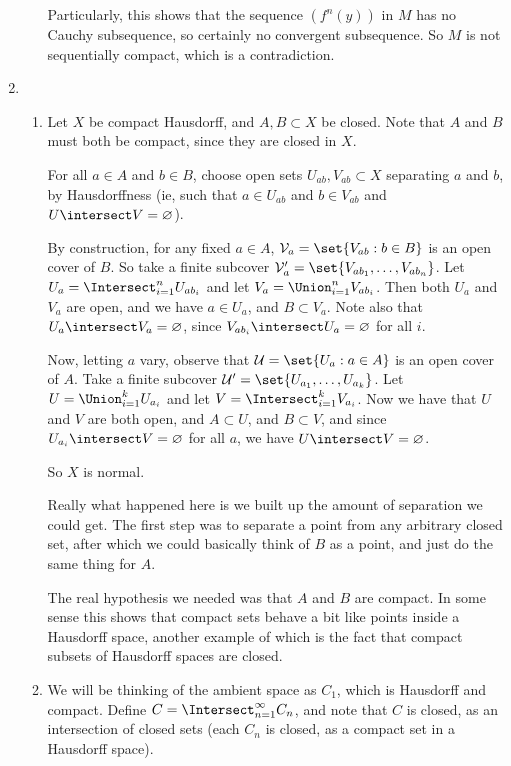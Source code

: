\documentclass[a4paper,12pt,fleqn]{article}
\begin{document}
\begin{enumerate}[label=\arabic*.,leftmargin=*]
\begin{enumerate}[label=(\alph*)]
    Particularly, this shows that the sequence \((f^n(y))\) in \(M\) has no
    Cauchy subsequence, so certainly no convergent subsequence. So \(M\) is not
    sequentially compact, which is a contradiction.
  \end{enumerate}
 \item
  \begin{enumerate}[label=(\alph*)]
   \item
    Let \(X\) be compact Hausdorff, and \(A, B \subset X\) be closed. Note that
    \(A\) and \(B\) must both be compact, since they are closed in \(X\).

    For all
    \(a \in A\) and \(b \in B\), choose open sets \(U_{ab}, V_{ab} \subset X\)
    separating \(a\) and \(b\), by Hausdorffness
    (ie, such that \(a \in U_{ab}\) and \(b \in V_{ab}\) and
    \(U \intersect V = \emptyset\)).

    By construction, for any fixed \(a \in A\),
    \(\mathcal V_a = \set{V_{ab} : b \in B}\) is an open cover of \(B\).
    So take a finite subcover
    \(\mathcal V_a' = \set{V_{ab_1}, \dotsc, V_{ab_n}}\).
    Let \(U_a = \Intersect_{i = 1}^n U_{ab_i}\) and let
    \(V_a = \Union_{i = 1}^n V_{ab_i}\). Then both \(U_a\) and
    \(V_a\) are open, and we have \(a \in U_a\), and
    \(B \subset V_a\). Note also that \(U_a \intersect V_a = \emptyset\), since
    \(V_{ab_i} \intersect U_a = \emptyset\) for all \(i\).

    Now, letting \(a\) vary, observe that \(\mathcal U = \set{U_a : a \in A}\)
    is an open cover of \(A\). Take a finite subcover
    \(\mathcal U' = \set{U_{a_1}, \dotsc, U_{a_k}}\).
    Let \(U = \Union_{i = 1}^k U_{a_i}\) and let
    \(V = \Intersect_{i = 1}^k V_{a_i}\).
    Now we have that \(U\) and \(V\) are both open, and \(A \subset U\),
    and \(B \subset V\), and since \(U_{a_i} \intersect V = \emptyset\) for all
    \(a\), we have \(U \intersect V = \emptyset\).

    So \(X\) is normal.
    \begin{remark}
     Really what happened here is we built up the amount of separation we could
     get. The first step was to separate a point from any arbitrary closed set,
     after which we could basically think of \(B\) as a point, and just do the
     same thing for \(A\).

     The real hypothesis we needed was that \(A\) and \(B\) are compact. In some
     sense this shows that compact sets behave a bit like points inside a
     Hausdorff space, another example of which is the fact that compact subsets
     of Hausdorff spaces are closed.
    \end{remark}
   \item
    We will be thinking of the ambient space as \(C_1\), which is Hausdorff and
    compact. Define \(C = \Intersect_{n = 1}^\infty C_n\), and note that \(C\)
    is closed, as an intersection of closed sets (each \(C_n\) is closed, as a
    compact set in a Hausdorff space).


\end{enumerate}
\end{enumerate}
\end{document}

